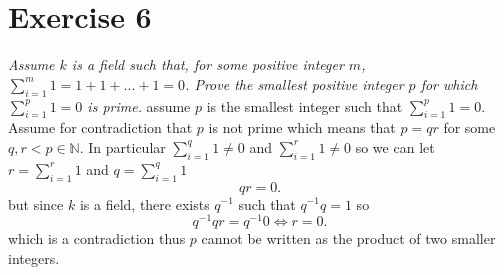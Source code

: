 \documentclass{article}
\begin{document}
    \section{Exercise 6}
    \emph{
        Assume $k$ is a field such that, for some positive integer $m$, $\sum_{i=1}^{m}1 = 1 + 1 + ... + 1 =0$. Prove the
        smallest positive integer $p$ for which $\sum_{i=1}^{p}1 = 0$ is prime.
    }
    assume $p$ is the smallest integer such that $\sum_{i=1}^{p}1 = 0$. Assume for contradiction that $p$ is not prime
    which means that $p = qr$ for some $q,r < p \in \mathbb{N}$. In particular $\sum_{i=1}^{q}1 \ne 0$ and $\sum_{i=1}^{r}1 \ne 0$ 
    so we can let $r = \sum_{i=1}^{r}1$ and $q = \sum_{i=1}^{q}1$
    \[
    qr = 0
    .\] 
    but since $k$ is a field, there exists $q^{-1}$ such that $q^{-1}q = 1$ so
    \[
    q^{-1}qr = q^{-1}0 \iff r = 0
    .\] 
    which is a contradiction thus $p$ cannot be written as the product of two smaller integers.

 
\end{document}
